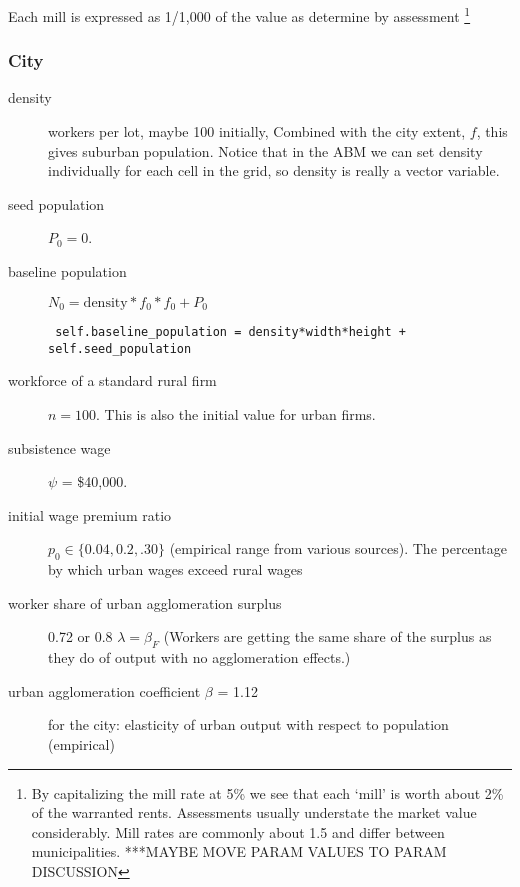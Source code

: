 Each mill is expressed as  1/1,000 of the value as determine by assessment \footnote{By capitalizing the mill rate at 5\%  we see that each `mill' is worth about 2\% of the warranted rents. Assessments usually understate the market value considerably. Mill rates are commonly about 1.5 and differ between municipalities. ***MAYBE MOVE PARAM VALUES TO PARAM DISCUSSION}


\subsubsection{City}
\begin{description}
\item [density] workers per lot, maybe 100 initially, Combined with the city extent, $f$, this gives suburban population. %
Notice that in the ABM we can set density individually for each cell in the grid, so density is really a vector variable.  %
\item [seed population] $P_0=0$. %
\item [baseline population]  $N_0=\mathrm{density} * f_0 * f_0 + P_0$ 
\begin{lstlisting}
 self.baseline_population = density*width*height + self.seed_population
\end{lstlisting}

\item [workforce of a standard rural firm] $n=100$. This is also the initial value for urban firms.


\item [subsistence wage] $\psi$ = \$40,000. %


\item [initial wage premium ratio] $p_0\in\{0.04,0.2,.30\}$ (empirical range from various sources). The percentage by which urban wages exceed rural wages 

\item [worker share of urban agglomeration surplus] 0.72 or 0.8 $\lambda=\beta_F$ (Workers are getting the same share of the surplus as they do of output with no agglomeration effects.) 
\item [urban agglomeration coefficient $\beta$ = 1.12] for the city: elasticity of urban output with respect to population (empirical)


\end{description}
